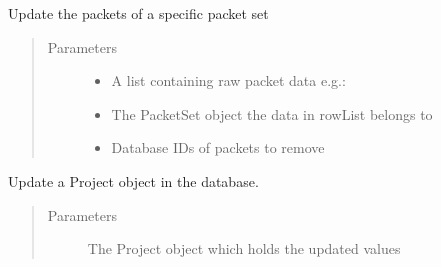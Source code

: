 \documentclass[letterpaper,10pt,english]{sphinxmanual}
\begin{document}
\begin{fulllineitems}
\begin{fulllineitems}
\label{\detokenize{src:src.Database.Database.updatePackets}}
Update the packets of a specific packet set
\begin{quote}\begin{description}
\item[{Parameters}] \leavevmode\begin{itemize}
\item {} 
 \textendash{} A list containing raw packet data
e.g.: 

\item {} 
 \textendash{} The PacketSet object the data in rowList belongs to

\item {} 
 \textendash{} Database IDs of packets to remove

\end{itemize}

\end{description}\end{quote}

\end{fulllineitems}


\begin{fulllineitems}
\label{\detokenize{src:src.Database.Database.updateProject}}
Update a Project object in the database.
\begin{quote}\begin{description}
\item[{Parameters}] \leavevmode
{} \textendash{} The Project object which holds the updated values

\end{description}\end{quote}

\end{fulllineitems}


\end{fulllineitems}

\end{document}
